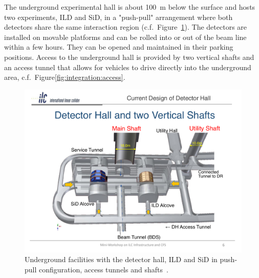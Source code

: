 The underground experimental hall is about 100~m below the surface and hosts two experiments, ILD and SiD, in a "push-pull" arrangement where both detectors share the same interaction region (c.f.~Figure~\ref{fig:integration:underground}). The detectors are installed on movable platforms and can be rolled into or out of the beam line within a few hours. They can be opened and maintained in their parking positions. Access to the underground hall is provided by two vertical shafts and an access tunnel that allows for vehicles to drive directly into the underground area, c.f.~Figure\ref{fig:integration:access}.

\begin{figure}[h!]
\includegraphics[width=1.0\hsize]{Integration/fig/Underground_Facilities.pdf}
\caption{\label{fig:integration:underground}Underground facilities with the detector hall, ILD and SiD in push-pull configuration, access tunnels and shafts~\cite{ild:bib:underground_facilities}. }
\end{figure}


